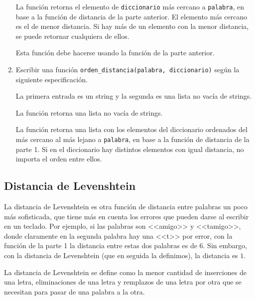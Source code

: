 \documentclass[a4paper,12pt]{book}
\theoremstyle{definition}
\begin{document}
\begin{enumerate}
		La función retorna el elemento de {\tt diccionario} más cercano a {\tt palabra}, en base a la función de distancia de la parte anterior. El elemento más cercano es el de menor distancia. Si hay más de un elemento con la menor distancia, se puede retornar cualquiera de ellos.
		
		Esta función debe hacerse usando la función de la parte anterior.
		
		\item Escribir una función {\tt orden\_distancia(palabra, diccionario)} según la siguiente especificación.
		
		La primera entrada es un string y la segunda es una lista no vacía de strings.
		
		La función retorna una lista no vacía de strings.
		
		La función retorna una lista con los elementos del diccionario ordenados del más cercano al más lejano a {\tt palabra}, en base a la función de distancia de la parte 1. Si en el diccionario hay distintos elementos con igual distancia, no importa el orden entre ellos.
	\end{enumerate}
	
	\subsection*{Distancia de Levenshtein}
	
	La distancia de Levenshtein es otra función de distancia entre palabras un poco más sofisticada, que tiene más en cuenta los errores que pueden darse al escribir en un teclado. Por ejemplo, si las palabras son <<amigo>> y <<tamigo>>, donde claramente en la segunda palabra hay una <<t>> por error, con la función de la parte 1 la distancia entre estas dos palabras es de $6$. Sin embargo, con la distancia de Levenshtein (que en seguida la definimos), la distancia es $1$.
	
	La distancia de Levenshtein se define como la menor cantidad de inserciones de una letra, eliminaciones de una letra y remplazos de una letra por otra que se necesitan para pasar de una palabra a la otra.
	
\end{document}
